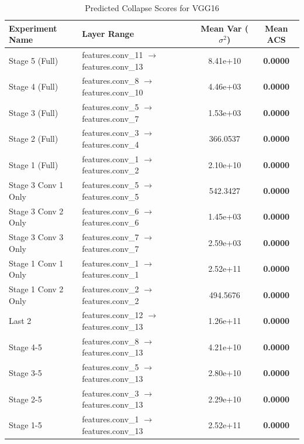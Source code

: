 \begin{table}[h]
\caption{Predicted Collapse Scores for VGG16}
\label{tab:acs_vgg16}
\begin{tabular}{llcc}
\toprule
Experiment Name & Layer Range & Mean Var ($\sigma^2$) & Mean ACS \\
\midrule
Stage 5 (Full) & features.conv\_11 $\to$ features.conv\_13 & 8.41e+10 & \textbf{0.0000} \\
Stage 4 (Full) & features.conv\_8 $\to$ features.conv\_10 & 4.46e+03 & \textbf{0.0000} \\
Stage 3 (Full) & features.conv\_5 $\to$ features.conv\_7 & 1.53e+03 & \textbf{0.0000} \\
Stage 2 (Full) & features.conv\_3 $\to$ features.conv\_4 & 366.0537 & \textbf{0.0000} \\
Stage 1 (Full) & features.conv\_1 $\to$ features.conv\_2 & 2.10e+10 & \textbf{0.0000} \\
Stage 3 Conv 1 Only & features.conv\_5 $\to$ features.conv\_5 & 542.3427 & \textbf{0.0000} \\
Stage 3 Conv 2 Only & features.conv\_6 $\to$ features.conv\_6 & 1.45e+03 & \textbf{0.0000} \\
Stage 3 Conv 3 Only & features.conv\_7 $\to$ features.conv\_7 & 2.59e+03 & \textbf{0.0000} \\
Stage 1 Conv 1 Only & features.conv\_1 $\to$ features.conv\_1 & 2.52e+11 & \textbf{0.0000} \\
Stage 1 Conv 2 Only & features.conv\_2 $\to$ features.conv\_2 & 494.5676 & \textbf{0.0000} \\
Last 2 & features.conv\_12 $\to$ features.conv\_13 & 1.26e+11 & \textbf{0.0000} \\
Stage 4-5 & features.conv\_8 $\to$ features.conv\_13 & 4.21e+10 & \textbf{0.0000} \\
Stage 3-5 & features.conv\_5 $\to$ features.conv\_13 & 2.80e+10 & \textbf{0.0000} \\
Stage 2-5 & features.conv\_3 $\to$ features.conv\_13 & 2.29e+10 & \textbf{0.0000} \\
Stage 1-5 & features.conv\_1 $\to$ features.conv\_13 & 2.52e+11 & \textbf{0.0000} \\
\bottomrule
\end{tabular}
\end{table}
